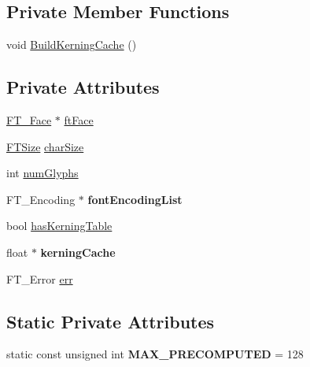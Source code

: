 \subsection*{Private Member Functions}
\begin{DoxyCompactItemize}
\item 
void \hyperlink{class_f_t_face_a65332b410fa5857c7282e2848166e245}{Build\+Kerning\+Cache} ()
\end{DoxyCompactItemize}
\subsection*{Private Attributes}
\begin{DoxyCompactItemize}
\item 
\hyperlink{struct_f_t___face_rec__}{F\+T\+\_\+\+Face} $\ast$ \hyperlink{class_f_t_face_a3b9db3f71041db6d43c5f38801926039}{ft\+Face}
\item 
\hyperlink{class_f_t_size}{F\+T\+Size} \hyperlink{class_f_t_face_a9434c7d82f20a91b2998ceadcaa5d84d}{char\+Size}
\item 
int \hyperlink{class_f_t_face_a07bd69c12d97cfed0f19d8f42deb9f31}{num\+Glyphs}
\item 
F\+T\+\_\+\+Encoding $\ast$ {\bfseries font\+Encoding\+List}\hypertarget{class_f_t_face_a582719a40849d7346d68180fdf2b9c13}{}\label{class_f_t_face_a582719a40849d7346d68180fdf2b9c13}

\item 
bool \hyperlink{class_f_t_face_a317a8c7187844488e8ea1caacc6b639d}{has\+Kerning\+Table}
\item 
float $\ast$ {\bfseries kerning\+Cache}\hypertarget{class_f_t_face_aebbfa204dfc08134f56dde9149fd0636}{}\label{class_f_t_face_aebbfa204dfc08134f56dde9149fd0636}

\item 
F\+T\+\_\+\+Error \hyperlink{class_f_t_face_a4a7f0387f6672f67c359d8f058d45337}{err}
\end{DoxyCompactItemize}
\subsection*{Static Private Attributes}
\begin{DoxyCompactItemize}
\item 
static const unsigned int {\bfseries M\+A\+X\+\_\+\+P\+R\+E\+C\+O\+M\+P\+U\+T\+ED} = 128\hypertarget{class_f_t_face_a5a416a97841e1b80a39e6d34d4d13f08}{}\label{class_f_t_face_a5a416a97841e1b80a39e6d34d4d13f08}

\end{DoxyCompactItemize}


